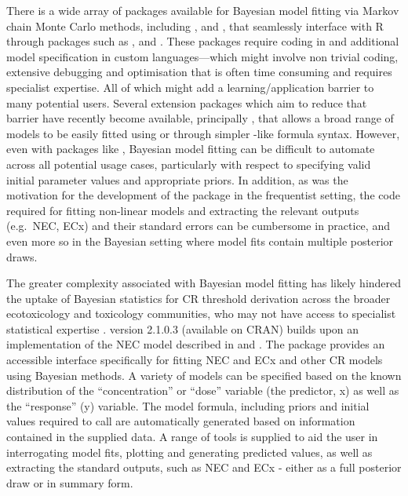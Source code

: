 \documentclass[
  shortnames]{jss}
\begin{document}
There is a wide array of packages available for Bayesian model fitting via Markov chain Monte Carlo methods, including  \citep{Lunn2000},  \citep{Plummer2003} and  \citep{Carpenter2017}, that seamlessly interface with R through packages such as ,  \citep{Su2015} and  \citep{rstan2021}. These packages require coding in  and additional model specification in custom languages---which might involve non trivial coding, extensive debugging and optimisation that is often time consuming and requires specialist expertise. All of which might add a learning/application barrier to many potential users. Several extension packages which aim to reduce that barrier have recently become available, principally  \citep{Burkner2017}, that allows a broad range of models to be easily fitted using  \citep{rstan2021} or  \citep{cmdstanr2022} through simpler -like formula syntax. However, even with packages like , Bayesian model fitting can be difficult to automate across all potential usage cases, particularly with respect to specifying valid initial parameter values and appropriate priors. In addition, as was the motivation for the development of the  package in the frequentist setting, the  code required for fitting non-linear models and extracting the relevant outputs (e.g.~NEC, ECx) and their standard errors can be cumbersome in practice, and even more so in the Bayesian setting where model fits contain multiple posterior draws.

The greater complexity associated with Bayesian model fitting has likely hindered the uptake of Bayesian statistics for CR threshold derivation across the broader ecotoxicology and toxicology communities, who may not have access to specialist statistical expertise \citep{Fisher2019}.  version 2.1.0.3 (available on CRAN) builds upon an implementation of the NEC model described in \citet{Fox2010} and \citet{Pires2002}. The  package provides an accessible interface specifically for fitting NEC and ECx and other CR models using Bayesian methods. A variety of models can be specified based on the known distribution of the ``concentration'' or ``dose'' variable (the predictor, x) as well as the ``response'' (y) variable. The model formula, including priors and initial values required to call  are automatically generated based on information contained in the supplied data. A range of tools is supplied to aid the user in interrogating model fits, plotting and generating predicted values, as well as extracting the standard outputs, such as NEC and ECx - either as a full posterior draw or in summary form.
\end{document}
